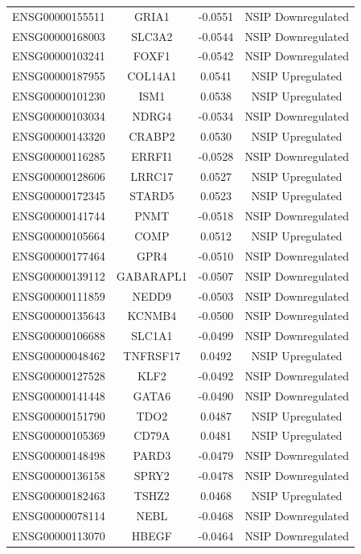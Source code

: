 \documentclass[
]{article}
\begin{document}
\begin{singlespace}
\begin{longtable}[t]{lccc}
ENSG00000155511 & GRIA1 & -0.0551 & NSIP Downregulated\\
ENSG00000168003 & SLC3A2 & -0.0544 & NSIP Downregulated\\
ENSG00000103241 & FOXF1 & -0.0542 & NSIP Downregulated\\
\addlinespace
ENSG00000187955 & COL14A1 & 0.0541 & NSIP Upregulated\\
ENSG00000101230 & ISM1 & 0.0538 & NSIP Upregulated\\
ENSG00000103034 & NDRG4 & -0.0534 & NSIP Downregulated\\
ENSG00000143320 & CRABP2 & 0.0530 & NSIP Upregulated\\
ENSG00000116285 & ERRFI1 & -0.0528 & NSIP Downregulated\\
\addlinespace
ENSG00000128606 & LRRC17 & 0.0527 & NSIP Upregulated\\
ENSG00000172345 & STARD5 & 0.0523 & NSIP Upregulated\\
ENSG00000141744 & PNMT & -0.0518 & NSIP Downregulated\\
ENSG00000105664 & COMP & 0.0512 & NSIP Upregulated\\
ENSG00000177464 & GPR4 & -0.0510 & NSIP Downregulated\\
\addlinespace
ENSG00000139112 & GABARAPL1 & -0.0507 & NSIP Downregulated\\
ENSG00000111859 & NEDD9 & -0.0503 & NSIP Downregulated\\
ENSG00000135643 & KCNMB4 & -0.0500 & NSIP Downregulated\\
ENSG00000106688 & SLC1A1 & -0.0499 & NSIP Downregulated\\
ENSG00000048462 & TNFRSF17 & 0.0492 & NSIP Upregulated\\
\addlinespace
ENSG00000127528 & KLF2 & -0.0492 & NSIP Downregulated\\
ENSG00000141448 & GATA6 & -0.0490 & NSIP Downregulated\\
ENSG00000151790 & TDO2 & 0.0487 & NSIP Upregulated\\
ENSG00000105369 & CD79A & 0.0481 & NSIP Upregulated\\
ENSG00000148498 & PARD3 & -0.0479 & NSIP Downregulated\\
\addlinespace
ENSG00000136158 & SPRY2 & -0.0478 & NSIP Downregulated\\
ENSG00000182463 & TSHZ2 & 0.0468 & NSIP Upregulated\\
ENSG00000078114 & NEBL & -0.0468 & NSIP Downregulated\\
ENSG00000113070 & HBEGF & -0.0464 & NSIP Downregulated\\

\end{longtable}
\end{singlespace}
\end{document}

